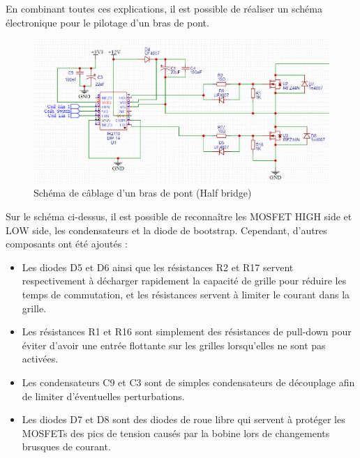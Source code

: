 \documentclass{article}
\begin{document}
En combinant toutes ces explications, il est possible de réaliser un schéma électronique pour le pilotage d'un bras de pont.
    \begin{figure}[H]
    \centering
    \includegraphics[width=0.7\linewidth]{Images/shemair2110_pontH_demi.png}
    \caption{Schéma de câblage d'un bras de pont (Half bridge)
    }
    \label{fig:half_bridge}
\end{figure}
\noindent
Sur le schéma ci-dessus, il est possible de reconnaître les MOSFET HIGH side et LOW side, les condensateurs et la diode de bootstrap. Cependant, d'autres composants ont été ajoutés :
\begin{itemize}
    \item Les diodes D5 et D6 ainsi que les résistances R2 et R17 servent respectivement à décharger rapidement la capacité de grille pour réduire les temps de commutation, et les résistances servent à limiter le courant dans la grille.
    \item Les résistances R1 et R16 sont simplement des résistances de pull-down pour éviter d'avoir une entrée flottante sur les grilles lorsqu'elles ne sont pas activées.
    \item Les condensateurs C9 et C3 sont de simples condensateurs de découplage afin de limiter d'éventuelles perturbations.
    \item Les diodes D7 et D8 sont des diodes de roue libre qui servent à protéger les MOSFETs des pics de tension causés par la bobine lors de changements brusques de courant.

\end{itemize}
\end{document}
